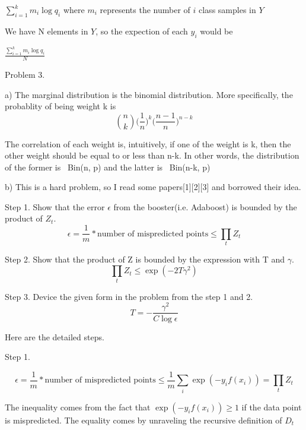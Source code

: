 \documentclass[11pt]{article}
\theoremstyle{definition}
\begin{document}
$ \sum_{i=1}^{k} m_i \log q_i $ where $m_i$ represents the number of $i$ class samples in $Y$

We have N elements in $Y$, so the expection of each $y_i$ would be 

$ \frac{\sum_{i=1}^{k} m_i \log q_i}{N} $

\pagebreak

Problem 3.

\bigskip
a) The marginal distribution is the binomial distribution. More specifically, the probablity of being weight k is
\begin{equation*}
\binom{n}{k}  \Big(\frac{1}{n}\Big)^k \Big({\frac {n-1}{n}}\Big)^{n-k}
\end{equation*}

The correlation of each weight is, intuitively, if one of the weight is k, then the other weight should be equal to or less than n-k. In other words, the distribution of the former is ~Bin(n, p) and the latter is ~Bin(n-k, p)

\bigskip
b)
This is a hard problem, so I read some papers[1][2][3] and borrowed their idea.

Step 1. Show that the error $\epsilon$ from the booster(i.e. Adaboost) is bounded by the product of $Z_t$.
\begin{equation*}
\epsilon = \frac{1}{m} * {\text{number of mispredicted points}} \le \prod_{t} Z_t
\end{equation*}

Step 2. Show that the product of Z is bounded by the expression with T and $\gamma$.
\begin{equation*}
\prod_{t} Z_t \le \exp(-2T\gamma^2)
\end{equation*}

Step 3. Device the given form in the problem from the step 1 and 2.
\begin{equation*}
T = - \frac{\gamma^2}{C\log \epsilon}
\end{equation*}

\bigskip
Here are the detailed steps.

Step 1.

\begin{equation*}
\epsilon = \frac{1}{m} * {\text{number of mispredicted points}} \le 
\frac{1}{m} \sum_{i} \exp(-y_if(x_i)) =
\prod_{t} Z_t
\end{equation*}

The inequality comes from the fact that $\exp(-y_if(x_i)) \ge 1$ if the data point is mispredicted. The equality comes by unraveling the recursive definition of $D_t$
\end{document}
